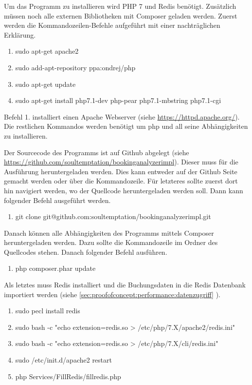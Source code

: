 Um das Programm zu installieren wird PHP 7 und Redis benötigt. Zusätzlich müssen noch alle externen Bibliotheken mit Composer geladen werden. Zuerst werden die Kommandozeilen-Befehle aufgeführt mit einer nachträglichen Erklärung. 

\begin{enumerate}
\item sudo apt-get apache2
\item sudo add-apt-repository ppa:ondrej/php
\item sudo apt-get update
\item sudo apt-get install php7.1-dev php-pear php7.1-mbstring php7.1-cgi
\end{enumerate}
Befehl 1. installiert einen Apache Webserver (siehe \url{https://httpd.apache.org/}). Die restlichen Kommandos werden benötigt um \gls{php} und all seine Abhängigkeiten zu installieren. 

Der Sourcecode des Programms ist auf Github abgelegt (siehe \url{https://github.com/soultemptation/bookinganalyzerimpl}). Dieser muss für die Ausführung heruntergeladen werden. Dies kann entweder auf der Github Seite gemacht werden oder über die Kommandozeile. Für letzteres sollte zuerst dort hin navigiert werden, wo der Quellcode heruntergeladen werden soll. Dann kann folgender Befehl ausgeführt werden.
\begin{enumerate}[resume]
\item git clone git@github.com:soultemptation/bookinganalyzerimpl.git
\end{enumerate}

Danach können alle Abhängigkeiten des Programms mittels Composer heruntergeladen werden. Dazu sollte die Kommandozeile im Ordner des Quellcodes stehen. Danach folgender Befehl ausführen.
\begin{enumerate}[resume]
\item php composer.phar update
\end{enumerate}

Als letztes muss Redis installiert und die Buchungsdaten in die Redis Datenbank importiert werden (siehe \cref{sec:proofofconcept:performance:datenzugriff} ).

\begin{enumerate}[resume]
\item sudo pecl install redis
\item sudo bash -c "echo extension=redis.so > /etc/php/7.X/apache2/redis.ini"
\item sudo bash -c "echo extension=redis.so > /etc/php/7.X/cli/redis.ini"
\item sudo /etc/init.d/apache2 restart
\item php Services/FillRedis/fillredis.php
\end{enumerate}

